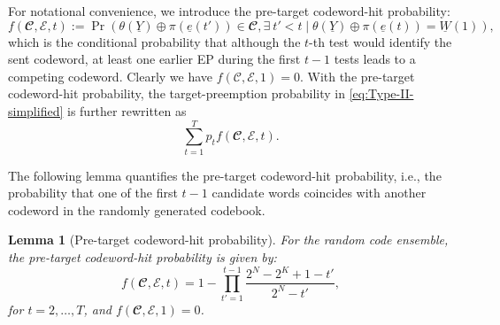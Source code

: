 \documentclass[letterpaper,draftclsnofoot,onecolumn]{IEEEtran}
\newtheorem{lemma}{Lemma}
\begin{document}
For notational convenience, we introduce the pre-target codeword-hit probability:
\begin{equation}
    f(\mathbfcal{C},\mathcal{E},t) := \Pr(\theta(\underline{Y})\oplus \pi(\underline{e}(t'))\in \mathbfcal{C},\exists\ t'< t \mid \theta(\underline{Y})\oplus \pi(\underline{e}(t))=\underline{W}(1)), \label{def:pre_target_hit}
\end{equation}
which is the conditional probability that although the $t$-th test would identify the sent codeword, at least one earlier EP during the first $t-1$ tests leads to a competing codeword. Clearly we have $f(\mathcal{C}, \mathcal{E}, 1) = 0$. With the pre-target codeword-hit probability, the target-preemption probability in \eqref{eq:Type-II-simplified} is further rewritten as
\begin{equation}
    \sum_{t=1}^{T}p_{t} f(\mathbfcal{C},\mathcal{E},t).\label{eq:Type-II-simplified-f}
\end{equation}

The following lemma quantifies the pre-target codeword-hit probability, i.e., the probability that one of the first $t-1$ candidate words coincides with another codeword in the randomly generated codebook.

\begin{lemma}[Pre-target codeword-hit probability]\label{lemma:1}
    For the random code ensemble, the pre-target codeword-hit probability is given by:
    \begin{equation}\label{eq:random_function}
        f(\mathbfcal{C},\mathcal{E},t) = 1 - \prod_{t'=1}^{t-1}\frac{2^N-2^K+1-t'}{2^N-t'},
    \end{equation}
    for $t = 2, \ldots, T$, and $f(\mathbfcal{C},\mathcal{E},1) = 0$.
\end{lemma}
\end{document}
